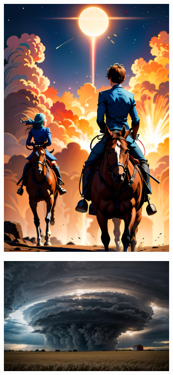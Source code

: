 \documentclass[a4paper]{article}
\begin{document}
\begin{figure}[htbp]
\centering
\includegraphics[width=0.8\textwidth]{meme-horseriders.png}

\label{fig:meme-horseriders}
\end{figure}

\begin{figure}[htbp]
\centering
\includegraphics[width=0.8\textwidth]{meme-cloudy-clouds.jpg}

\label{fig:meme-cloudy-clouds}
\end{figure}
\end{document}
